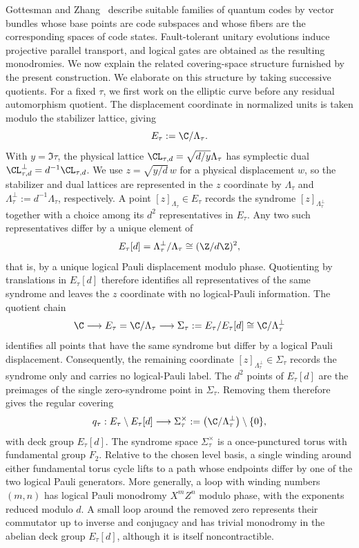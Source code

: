 \documentclass[a4paper, aps, pra, 11pt, onecolumn, tightenlines, superscriptaddress]{revtex4-2}
\begin{document}
Gottesman and Zhang~\cite{gottesman2017fibre} describe suitable families of quantum codes by vector bundles whose base points are code subspaces and whose fibers are the corresponding spaces of code states. Fault-tolerant unitary evolutions induce projective parallel transport, and logical gates are obtained as the resulting monodromies. We now explain the related covering-space structure furnished by the present construction.
%
We elaborate on this structure by taking successive quotients. For a fixed $\tau$, we first work on the elliptic curve before any residual automorphism quotient. The displacement coordinate in normalized units is taken modulo the stabilizer lattice, giving
\begin{equation}
E_\tau:=\C/\Lambda_\tau.
\end{equation}
With $y=\Im\tau$, the physical lattice $\CL_{\tau,d}=\sqrt{d/y}\Lambda_\tau$ has symplectic dual $\CL_{\tau,d}^{\perp}=d^{-1}\CL_{\tau,d}$. We use $z=\sqrt{y/d}\,w$ for a physical displacement $w$, so the stabilizer and dual lattices are represented in the $z$ coordinate by $\Lambda_\tau$ and $\Lambda_\tau^{\perp}:=d^{-1}\Lambda_\tau$, respectively.
%
A point $[z]_{\Lambda_\tau}\in E_\tau$ records the syndrome
$[z]_{\Lambda_\tau^\perp}$ together with a choice among its $d^2$
representatives in $E_\tau$. Any two such representatives differ by a
unique element of
\begin{equation}
E_\tau[d]
=
\Lambda_\tau^\perp/\Lambda_\tau
\cong(\Z/d\Z)^2,
\end{equation}
that is, by a unique logical Pauli displacement modulo phase.
Quotienting by translations in $E_\tau[d]$ therefore identifies all
representatives of the same syndrome and leaves the $z$ coordinate with
no logical-Pauli information.
%
The quotient chain
\begin{equation}
\C
\longrightarrow
E_\tau=\C/\Lambda_\tau
\longrightarrow
\Sigma_\tau:=E_\tau/E_\tau[d]
\cong
\C/\Lambda_\tau^\perp
\end{equation}
identifies all points that have the same syndrome but differ by a logical Pauli displacement. Consequently, the remaining coordinate $[z]_{\Lambda_\tau^\perp}\in\Sigma_\tau$ records the syndrome only and carries no logical-Pauli label. The $d^2$ points of $E_\tau[d]$ are the preimages of the single zero-syndrome point in $\Sigma_\tau$. Removing them therefore gives the regular covering
\begin{equation}
q_\tau:
E_\tau\setminus E_\tau[d]
\longrightarrow
\Sigma_\tau^\times
:=
\bigl(\C/\Lambda_\tau^\perp\bigr)\setminus\{0\},\label{eq:qtau}
\end{equation}
with deck group $E_\tau[d]$. 
The syndrome space $\Sigma_\tau^\times$ is a once-punctured torus with fundamental group $F_2$. Relative to the chosen level basis, a single winding around either fundamental torus cycle lifts to a path whose endpoints differ by one of the two logical Pauli generators. More generally, a loop with winding numbers $(m,n)$ has logical Pauli monodromy $X^m Z^n$ modulo phase, with the exponents reduced modulo $d$. A small loop around the removed zero represents their commutator up to inverse and conjugacy and has trivial monodromy in the abelian deck group $E_\tau[d]$, although it is itself noncontractible.
\end{document}
